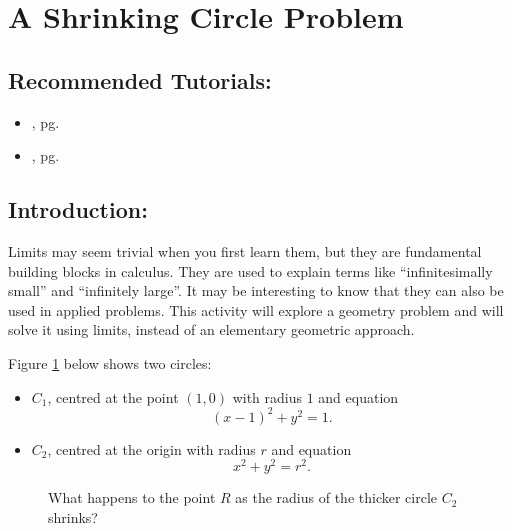 \section{A Shrinking Circle Problem}
\label{sec:applied_limit_problem}

\subsection*{Recommended Tutorials:}
\begin{itemize}[noitemsep]
	\item {}, pg. \pageref{chp:equation_solvers}
	\item {}, pg. \pageref{chp:limits}
\end{itemize}

\subsection*{Introduction:}

Limits may seem trivial when you first learn them, but they are fundamental building blocks in calculus. They are used to explain terms like ``infinitesimally small'' and ``infinitely large''. It may be interesting to know that they can also be used in applied problems. This activity will explore a geometry problem and will solve it using limits, instead of an elementary geometric approach.

Figure \ref{fig:applied_limit} below shows two circles:
\begin{itemize}
	\item $C_1$, centred at the point $(1,0)$ with radius $1$ and equation \[(x-1)^2+y^2=1.\]
	\item $C_2$, centred at the origin with radius $r$ and equation \[x^2+y^2=r^2.\]
\end{itemize}

\begin{figure}[h]
\centering
\label{fig:applied_limit}
\caption{What happens to the point $R$ as the radius of the thicker circle $C_2$ shrinks?}
\pgfplotsset{compat=1.5.1}
\end{figure}

